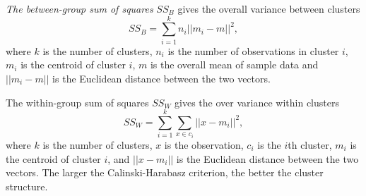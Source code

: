 \emph{The between-group sum of squares} $SS_B$ gives the overall variance
between clusters
\begin{equation}
 SS_B = \sum_{i=1}^k n_i ||m_i-m||^2,
\end{equation}
where $k$ is the number of clusters, $n_i$ is the number of 
observations in cluster $i$, $m_i$ is the centroid of cluster $i$, 
$m$ is the overall mean of sample data and $||m_i-m||$ is the 
Euclidean distance between the two vectors.

The within-group sum of squares $SS_W$ gives the over variance 
within clusters
\begin{equation}
 SS_W = \sum_{i=1}^k \sum_{x\in c_i} ||x-m_i||^2,
\end{equation}
where $k$ is the number of clusters, $x$ is the observation, 
$c_i$ is the $i$th cluster, $m_i$ is the centroid of cluster $i$, and 
$||x-m_i||$ is the Euclidean distance between the two vectors.
The larger the Calinski-Harabasz criterion, the better the 
cluster structure.


